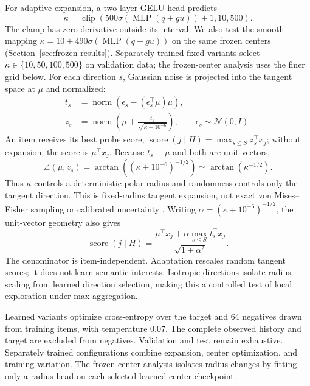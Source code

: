 \documentclass[runningheads]{llncs}
\begin{document}
For adaptive expansion, a two-layer GELU head predicts
\begin{equation}
 \kappa=\operatorname{clip}\!\left(500\sigma(\operatorname{MLP}(q+gu))+1,
 10,500\right).
 \label{eq:kappa}
\end{equation}
The clamp has zero derivative outside its interval. We also test the smooth
mapping $\kappa=10+490\sigma(\operatorname{MLP}(q+gu))$ on the same frozen
centers (Section~\ref{sec:frozen-results}).
Separately trained fixed variants select $\kappa\in\{10,50,100,500\}$ on
validation data; the frozen-center analysis uses the finer grid below.
For each direction $s$, Gaussian noise is projected into the tangent
space at $\mu$ and normalized:
\begin{align}
 t_s&=\operatorname{norm}\!\left(
 \epsilon_s-(\epsilon_s^\top\mu)\mu\right),\\
 z_s&=\operatorname{norm}\!\left(
 \mu+\frac{t_s}{\sqrt{\kappa+10^{-6}}}\right),
 \qquad \epsilon_s\sim\mathcal{N}(0,I).
 \label{eq:probes}
\end{align}
An item receives its best probe score,
$\operatorname{score}(j\mid H)=\max_{s\leq S}z_s^\top x_j$; without expansion,
the score is $\mu^\top x_j$. Because $t_s\perp\mu$ and both are unit vectors,
\begin{equation}
 \angle(\mu,z_s)=\arctan\!\left((\kappa+10^{-6})^{-1/2}\right)
 \simeq \arctan(\kappa^{-1/2}).
 \label{eq:angle}
\end{equation}
Thus $\kappa$ controls a deterministic polar radius and randomness controls only
the tangent direction. This is fixed-radius tangent expansion, not exact
von Mises--Fisher sampling or calibrated uncertainty
\cite{mardia2000directional}.
Writing $\alpha=(\kappa+10^{-6})^{-1/2}$, the unit-vector geometry also gives
\begin{equation}
 \operatorname{score}(j\mid H)=
 \frac{\mu^\top x_j+\alpha\max_{s\leq S}t_s^\top x_j}
 {\sqrt{1+\alpha^2}}.
 \label{eq:score-decomposition}
\end{equation}
The denominator is item-independent. Adaptation rescales random tangent
scores; it does not learn semantic interests. Isotropic directions isolate
radius scaling from learned direction selection, making this a controlled
test of local exploration under max aggregation.

Learned variants optimize cross-entropy over the target and 64 negatives drawn
from training items, with temperature 0.07. The complete observed history and
target are excluded from negatives. Validation and test remain exhaustive.
Separately trained configurations combine expansion, center optimization, and
training variation. The frozen-center analysis isolates radius changes by
fitting only a radius head on each selected learned-center checkpoint.
\end{document}
